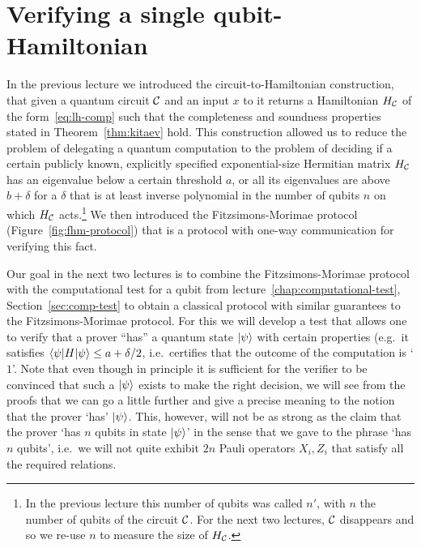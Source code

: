 \chapter{Verifying a single qubit-Hamiltonian}

In the previous lecture we introduced the circuit-to-Hamiltonian construction, that given a quantum circuit $\mathcal{C}$ and an input $x$ to it returns a Hamiltonian $H_{\mathcal{C}}$ of the form~\eqref{eq:lh-comp} such that the completeness and soundness properties stated in Theorem~\ref{thm:kitaev} hold. This construction allowed us to reduce the problem of delegating a quantum computation to the problem of deciding if a certain publicly known, explicitly specified exponential-size Hermitian matrix $H_{\mathcal{C}}$ has an eigenvalue below a certain threshold $a$, or all its eigenvalues are above $b+\delta$ for a $\delta$ that is at least inverse polynomial in the number of qubits $n$ on which $H_{\mathcal{C}}$ acts.\footnote{In the previous lecture this number of qubits was called $n'$, with $n$ the number of qubits of the circuit $\mathcal{C}$. For the next two lectures, $\mathcal{C}$ disappears and so we re-use $n$ to measure the size of $H_{\mathcal{C}}$.} We then introduced the Fitzsimons-Morimae protocol (Figure~\ref{fig:fhm-protocol}) that is a protocol with one-way communication for verifying this fact. 

Our goal in the next two lectures is to combine the Fitzsimons-Morimae protocol with the computational test for a qubit from lecture~\ref{chap:computational-test}, Section~\ref{sec:comp-test} to obtain a classical protocol with similar guarantees to the Fitzsimons-Morimae protocol. For this we will develop a test that allows one to verify that a prover ``has'' a quantum state $|\psi\rangle$ with certain properties (e.g.\ it satisfies $\langle\psi|H|\psi\rangle \leq a + \delta/2$, i.e.\ certifies that the outcome of the computation is `$1$'. Note that even though in principle it is sufficient for the verifier to be convinced  that such a $|\psi\rangle$ exists to make the right decision, we will see from the proofs that we can go a little further and give a precise meaning to the notion that the prover `has' $|\psi\rangle$. This, however, will not be as strong as the claim that the prover `has $n$ qubits in state $|\psi\rangle$' in the sense that we gave to the phrase `has $n$ qubits', i.e.\ we will not quite exhibit $2n$ Pauli operators $X_i,Z_i$ that satisfy all the required relations. 


